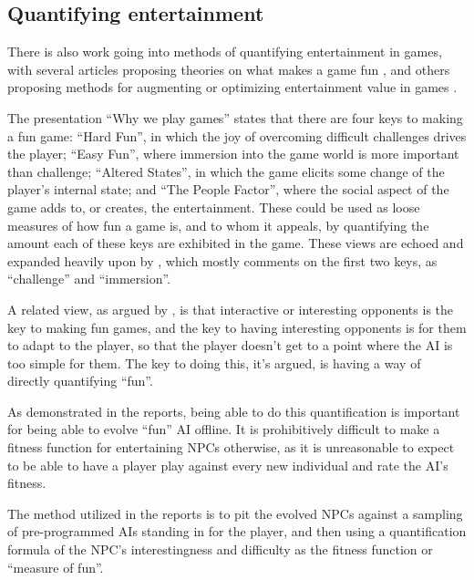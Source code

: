 \subsection{Quantifying entertainment}
\label{sec:quant-entert}

There is also work going into methods of quantifying entertainment in games,
with several articles proposing theories on what makes a game fun
\citep[e.g.][]{malone1981makes,read2002endurability,
  federoff2002heuristics,lazzaro2004we,koster2004theory}, and others proposing
methods for augmenting or optimizing entertainment value in games
\citep[e.g.][]{yannakakis2009real,yannakakis2008model,yannakakis2007towards,yannakakis2004interactive}.

The presentation ``Why we play games'' \citep{lazzaro2004we} states that there
are four keys to making a fun game: ``Hard Fun'', in which the joy of overcoming
difficult challenges drives the player; ``Easy Fun'', where immersion into the
game world is more important than challenge; ``Altered States'', in which the
game elicits some change of the player's internal state; and ``The People
Factor'', where the social aspect of the game adds to, or creates, the
entertainment. These could be used as loose measures of how fun a game is, and
to whom it appeals, by quantifying the amount each of these keys are exhibited
in the game. These views are echoed and expanded heavily upon by
\citet{federoff2002heuristics}, which mostly comments on the first two keys, as
``challenge'' and ``immersion''.

A related view, as argued by
\citet{yannakakis2004interactive,yannakakis2004evolving}, is that interactive or
interesting opponents is the key to making fun games, and the key to having
interesting opponents is for them to adapt to the player, so that the player
doesn't get to a point where the AI is too simple for them. The key to doing
this, it's argued, is having a way of directly quantifying ``fun''.

As demonstrated in the reports, being able to do this quantification is
important for being able to evolve ``fun'' AI offline. It is prohibitively
difficult to make a fitness function for entertaining NPCs otherwise, as it is
unreasonable to expect to be able to have a player play against every new
individual and rate the AI's fitness.

The method utilized in the reports is to pit the evolved NPCs against a sampling
of pre-programmed AIs standing in for the player, and then using a
quantification formula of the NPC's interestingness and difficulty as the
fitness function or ``measure of fun''.

